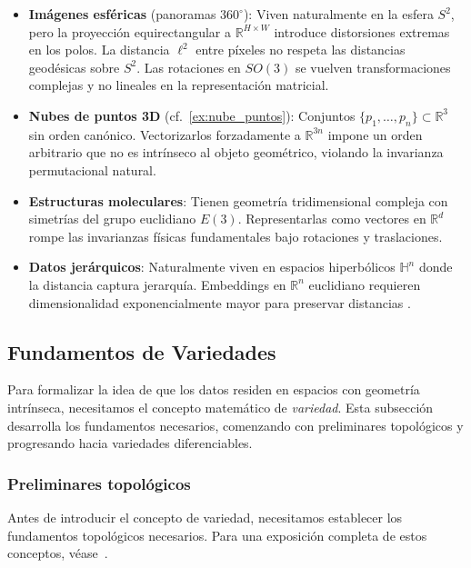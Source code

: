 \begin{itemize}
    \item \textbf{Imágenes esféricas} (panoramas $360^\circ$): Viven naturalmente en la esfera $S^2$, pero la proyección equirectangular a $\mathbb{R}^{H \times W}$ introduce distorsiones extremas en los polos. La distancia $\ell^2$ entre píxeles no respeta las distancias geodésicas sobre $S^2$. Las rotaciones en $SO(3)$ se vuelven transformaciones complejas y no lineales en la representación matricial.

    \item \textbf{Nubes de puntos 3D} (cf.~\autoref{ex:nube_puntos}): Conjuntos $\{p_1, \ldots, p_n\} \subset \mathbb{R}^3$ sin orden canónico. Vectorizarlos forzadamente a $\mathbb{R}^{3n}$ impone un orden arbitrario que no es intrínseco al objeto geométrico, violando la invarianza permutacional natural.

    \item \textbf{Estructuras moleculares}: Tienen geometría tridimensional compleja con simetrías del grupo euclidiano $E(3)$. Representarlas como vectores en $\mathbb{R}^d$ rompe las invarianzas físicas fundamentales bajo rotaciones y traslaciones.

    \item \textbf{Datos jerárquicos}: Naturalmente viven en espacios hiperbólicos $\mathbb{H}^n$ donde la distancia captura jerarquía. Embeddings en $\mathbb{R}^n$ euclidiano requieren dimensionalidad exponencialmente mayor para preservar distancias \citep{nickel2017poincare}.
\end{itemize}

\subsection{Fundamentos de Variedades}\label{subsec:fundamentos_variedades}

Para formalizar la idea de que los datos residen en espacios con geometría intrínseca, necesitamos el concepto matemático de \textit{variedad}. Esta subsección desarrolla los fundamentos necesarios, comenzando con preliminares topológicos y progresando hacia variedades diferenciables.

\subsubsection{Preliminares topológicos}\label{subsubsec:preliminares_topologicos}

Antes de introducir el concepto de variedad, necesitamos establecer los fundamentos topológicos necesarios. Para una exposición completa de estos conceptos, véase~\citet{munkres2000topology}.

